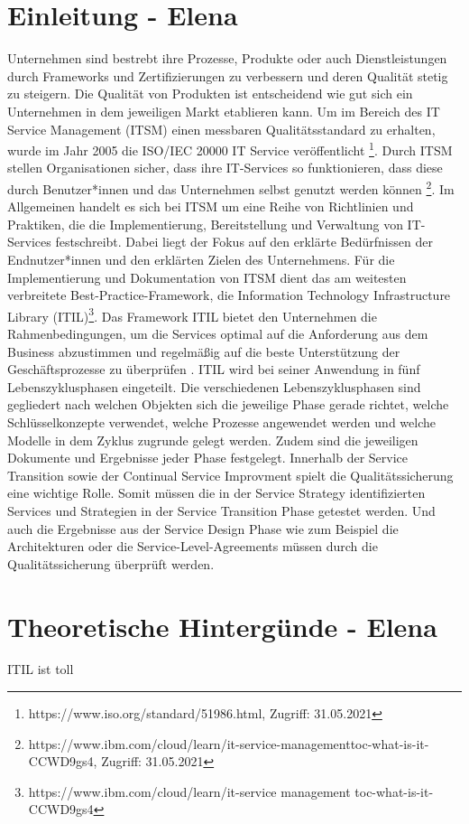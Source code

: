 \documentclass[sigconf]{acmart}
\begin{document}
\section{Einleitung - Elena}
Unternehmen sind bestrebt ihre Prozesse, Produkte oder auch Dienstleistungen durch Frameworks und Zertifizierungen zu verbessern und deren Qualität stetig zu steigern. Die Qualität von Produkten ist entscheidend wie gut sich ein Unternehmen in dem jeweiligen Markt etablieren kann. Um im Bereich des IT Service Management (ITSM) einen messbaren Qualitätsstandard zu erhalten, wurde im Jahr 2005 die ISO/IEC 20000 IT Service veröffentlicht \footnote{https://www.iso.org/standard/51986.html, Zugriff: 31.05.2021}. Durch ITSM stellen Organisationen sicher, dass ihre IT-Services so funktionieren, dass diese durch Benutzer*innen und das Unternehmen selbst genutzt werden können \footnote{https://www.ibm.com/cloud/learn/it-service-managementtoc-what-is-it-CCWD9gs4, Zugriff: 31.05.2021}. Im Allgemeinen handelt es sich bei ITSM um eine Reihe von Richtlinien und Praktiken, die die Implementierung, Bereitstellung und Verwaltung von IT-Services festschreibt. Dabei liegt der Fokus auf den erklärte Bedürfnissen der Endnutzer*innen und den erklärten Zielen des Unternehmens.
Für die Implementierung und Dokumentation von ITSM dient das
am weitesten verbreitete Best-Practice-Framework, die Information Technology Infrastructure Library (ITIL)\footnote{https://www.ibm.com/cloud/learn/it-service management toc-what-is-it-CCWD9gs4}. Das Framework ITIL bietet den Unternehmen die Rahmenbedingungen, um die Services optimal auf die Anforderung aus dem Business abzustimmen und regelmäßig auf die beste Unterstützung der Geschäftsprozesse zu überprüfen \cite{Beims.2015}. ITIL wird bei seiner Anwendung in fünf Lebenszyklusphasen eingeteilt. Die verschiedenen Lebenszyklusphasen sind gegliedert nach welchen Objekten sich die jeweilige Phase gerade richtet, welche Schlüsselkonzepte verwendet, welche Prozesse angewendet werden und welche Modelle in dem Zyklus zugrunde gelegt werden. Zudem sind die jeweiligen Dokumente und Ergebnisse jeder Phase festgelegt. Innerhalb der Service Transition sowie der Continual Service Improvment spielt die Qualitätssicherung
eine wichtige Rolle. Somit müssen die in der Service Strategy identifizierten Services und Strategien in der Service Transition Phase getestet werden. Und auch die Ergebnisse aus der Service Design Phase wie zum Beispiel die Architekturen oder die Service-Level-Agreements müssen durch die Qualitätssicherung überprüft werden\cite{Beims.2015}.
\section{Theoretische Hintergünde - Elena}
ITIL ist toll
\end{document}
